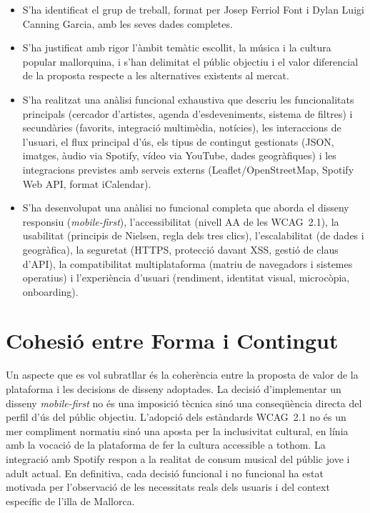\begin{itemize}
    \item S'ha identificat el grup de treball, format per Josep Ferriol Font i Dylan Luigi Canning Garcia, amb les seves dades completes.
    \item S'ha justificat amb rigor l'àmbit temàtic escollit, la música i la cultura popular mallorquina, i s'han delimitat el públic objectiu i el valor diferencial de la proposta respecte a les alternatives existents al mercat.
    \item S'ha realitzat una anàlisi funcional exhaustiva que descriu les funcionalitats principals (cercador d'artistes, agenda d'esdeveniments, sistema de filtres) i secundàries (favorits, integració multimèdia, notícies), les interaccions de l'usuari, el flux principal d'ús, els tipus de contingut gestionats (JSON, imatges, àudio via Spotify, vídeo via YouTube, dades geogràfiques) i les integracions previstes amb serveis externs (Leaflet/OpenStreetMap, Spotify Web API, format iCalendar).
    \item S'ha desenvolupat una anàlisi no funcional completa que aborda el disseny responsiu (\textit{mobile-first}), l'accessibilitat (nivell AA de les WCAG~2.1), la usabilitat (principis de Nielsen, regla dels tres clics), l'escalabilitat (de dades i geogràfica), la seguretat (HTTPS, protecció davant XSS, gestió de claus d'API), la compatibilitat multiplataforma (matriu de navegadors i sistemes operatius) i l'experiència d'usuari (rendiment, identitat visual, microcòpia, onboarding).
\end{itemize}

\section{Cohesió entre Forma i Contingut}

Un aspecte que es vol subratllar és la coherència entre la proposta de valor de la plataforma i les decisions de disseny adoptades. La decisió d'implementar un disseny \textit{mobile-first} no és una imposició tècnica sinó una conseqüència directa del perfil d'ús del públic objectiu. L'adopció dels estàndards WCAG~2.1 no és un mer compliment normatiu sinó una aposta per la inclusivitat cultural, en línia amb la vocació de la plataforma de fer la cultura accessible a tothom. La integració amb Spotify respon a la realitat de consum musical del públic jove i adult actual. En definitiva, cada decisió funcional i no funcional ha estat motivada per l'observació de les necessitats reals dels usuaris i del context específic de l'illa de Mallorca.

